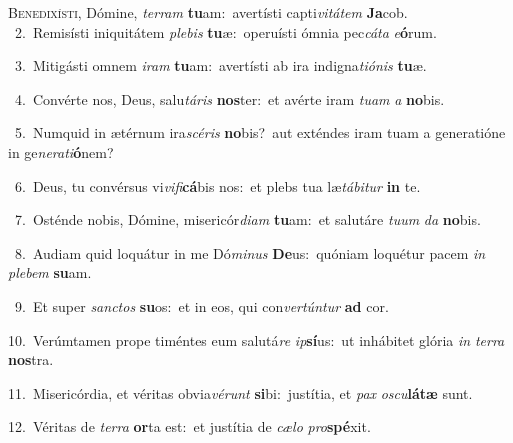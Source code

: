\lettrine{\initial\textcolor{\initialcolor}{B}}{enedixísti,} Dómine, \textit{ter}\-\textit{ram} \textbf{tu}\-am:~\star avertísti capti\-\textit{vi}\-\textit{tá}\textit{tem} \textbf{Ja}\-cob.\\
{\numbfont\textcolor{\numbcolor}{~2.}}~Remisísti iniquitátem \textit{ple}\-\textit{bis} \textbf{tu}\-æ:~\star operuísti ómnia pec\-\textit{cá}\-\textit{ta} \textit{e}\-\textbf{ó}rum.\par
{\numbfont\textcolor{\numbcolor}{~3.}}~Mitigásti omnem \textit{i}\-\textit{ram} \textbf{tu}\-am:~\star avertísti ab ira indigna\-\textit{ti}\-\textit{ó}\textit{nis} \textbf{tu}\-æ.\par
{\numbfont\textcolor{\numbcolor}{~4.}}~Convérte nos, Deus, salu\-\textit{tá}\-\textit{ris} \textbf{nos}\-ter:~\star et avérte iram \textit{tu}\-\textit{am} \textit{a} \textbf{no}\-bis.\par
{\numbfont\textcolor{\numbcolor}{~5.}}~Numquid in ætérnum ira\-\textit{scé}\-\textit{ris} \textbf{no}\-bis?~\star aut exténdes iram tuam a generatióne in ge\-\textit{ne}\-\textit{ra}\textit{ti}\textbf{ó}nem?\par
{\numbfont\textcolor{\numbcolor}{~6.}}~Deus, tu convérsus vi\-\textit{vi}\-\textit{fi}\textbf{cá}bis nos:~\star et plebs tua læ\-\textit{tá}\-\textit{bi}\textit{tur} \textbf{in} te.\par
{\numbfont\textcolor{\numbcolor}{~7.}}~Osténde nobis, Dómine, misericór\-\textit{di}\-\textit{am} \textbf{tu}\-am:~\star et salutáre \textit{tu}\-\textit{um} \textit{da} \textbf{no}\-bis.\par
{\numbfont\textcolor{\numbcolor}{~8.}}~Audiam quid loquátur in me Dó\-\textit{mi}\-\textit{nus} \textbf{De}\-us:~\star quóniam loquétur pacem \textit{in} \textit{ple}\-\textit{bem} \textbf{su}\-am.\par
{\numbfont\textcolor{\numbcolor}{~9.}}~Et super \textit{sanc}\-\textit{tos} \textbf{su}\-os:~\star et in eos, qui con\-\textit{ver}\-\textit{tún}\textit{tur} \textbf{ad} cor.\par
{\numbfont\textcolor{\numbcolor}{10.}}~Verúmtamen prope timéntes eum salutá\textit{re} \textit{ip}\-\textbf{sí}us:~\star ut inhábitet glória \textit{in} \textit{ter}\-\textit{ra} \textbf{nos}\-tra.\par
{\numbfont\textcolor{\numbcolor}{11.}}~Misericórdia, et véritas obvia\-\textit{vé}\-\textit{runt} \textbf{si}\-bi:~\star justítia, et \textit{pax} \textit{os}\-\textit{cu}\textbf{lá}\textbf{tæ} sunt.\par
{\numbfont\textcolor{\numbcolor}{12.}}~Véritas de \textit{ter}\-\textit{ra} \textbf{or}\-ta est:~\star et justítia de \textit{cæ}\-\textit{lo} \textit{pro}\-\textbf{spé}xit.\par
